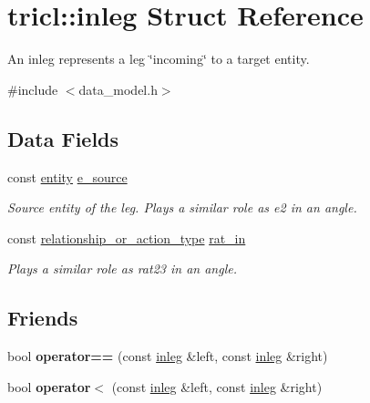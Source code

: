 \hypertarget{structtricl_1_1inleg}{}\section{tricl\+:\+:inleg Struct Reference}
\label{structtricl_1_1inleg}


An inleg represents a leg \char`\"{}incoming\char`\"{} to a target entity.  




{\ttfamily \#include $<$data\+\_\+model.\+h$>$}

\subsection*{Data Fields}
\begin{DoxyCompactItemize}
\item 
\mbox{\label{structtricl_1_1inleg_a5ab2f2cc36d191a4ce5ff6e0f2537fdb}} 
const \hyperlink{namespacetricl_a57273122278e8b301844e2a2e1f0742f}{entity} \hyperlink{structtricl_1_1inleg_a5ab2f2cc36d191a4ce5ff6e0f2537fdb}{e\+\_\+source}
\begin{DoxyCompactList}\small\item\em Source entity of the leg. Plays a similar role as {\ttfamily e2} in an angle. \end{DoxyCompactList}\item 
\mbox{\label{structtricl_1_1inleg_aa0bf7ed4910869446d610bf75d05fc34}} 
const \hyperlink{namespacetricl_a2d01894944fb58a8fedc0912a48d13f8}{relationship\+\_\+or\+\_\+action\+\_\+type} \hyperlink{structtricl_1_1inleg_aa0bf7ed4910869446d610bf75d05fc34}{rat\+\_\+in}
\begin{DoxyCompactList}\small\item\em Plays a similar role as {\ttfamily rat23} in an angle. \end{DoxyCompactList}\end{DoxyCompactItemize}
\subsection*{Friends}
\begin{DoxyCompactItemize}
\item 
\mbox{\label{structtricl_1_1inleg_a2882c00597e94a9fb19cde857cfe5003}} 
bool {\bfseries operator==} (const \hyperlink{structtricl_1_1inleg}{inleg} \&left, const \hyperlink{structtricl_1_1inleg}{inleg} \&right)
\item 
\mbox{\label{structtricl_1_1inleg_a8ddd31813cdcbb1b7c88d51fcd01cd23}} 
bool {\bfseries operator$<$} (const \hyperlink{structtricl_1_1inleg}{inleg} \&left, const \hyperlink{structtricl_1_1inleg}{inleg} \&right)
\end{DoxyCompactItemize}


